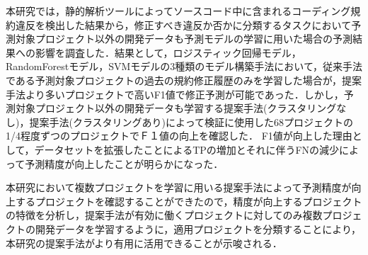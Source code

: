 \documentclass[submit,noauthor,dvipdfmx]{ipsj}
\begin{document}
本研究では，静的解析ツールによってソースコード中に含まれるコーディング規約違反を検出した結果から，修正すべき違反か否かに分類するタスクにおいて予測対象プロジェクト以外の開発データも予測モデルの学習に用いた場合の予測結果への影響を調査した．結果として，ロジスティック回帰モデル，RandomForestモデル，SVMモデルの3種類のモデル構築手法において，従来手法である予測対象プロジェクトの過去の規約修正履歴のみを学習した場合が，提案手法より多いプロジェクトで高いF1値で修正予測が可能であった．しかし，予測対象プロジェクト以外の開発データも学習する提案手法(クラスタリングなし)，提案手法(クラスタリングあり)によって検証に使用した68プロジェクトの1/4程度ずつのプロジェクトでＦ１値の向上を確認した．
F1値が向上した理由として，データセットを拡張したことによるTPの増加とそれに伴うFNの減少によって予測精度が向上したことが明らかになった．

本研究において複数プロジェクトを学習に用いる提案手法によって予測精度が向上するプロジェクトを確認することができたので，精度が向上するプロジェクトの特徴を分析し，提案手法が有効に働くプロジェクトに対してのみ複数プロジェクトの開発データを学習するように，適用プロジェクトを分類することにより，本研究の提案手法がより有用に活用できることが示唆される．



\end{document}
